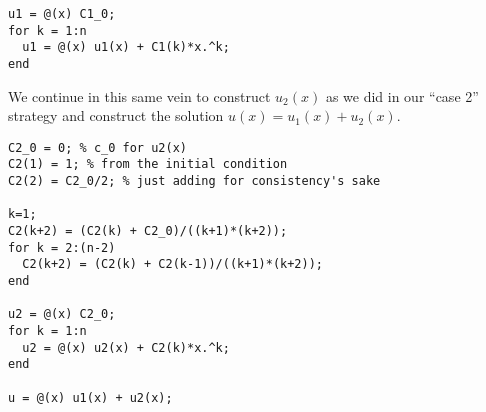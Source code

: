 \begin{lstlisting}[name=lec9_ex1]
u1 = @(x) C1_0;
for k = 1:n
  u1 = @(x) u1(x) + C1(k)*x.^k;
end
\end{lstlisting}
We continue in this same vein to construct $u_2(x)$ as we did in our ``case 2'' strategy and construct the solution $u(x) = u_1(x) + u_2(x)$.
\begin{lstlisting}[name=lec9_ex1]
C2_0 = 0; % c_0 for u2(x)
C2(1) = 1; % from the initial condition
C2(2) = C2_0/2; % just adding for consistency's sake

k=1;
C2(k+2) = (C2(k) + C2_0)/((k+1)*(k+2));
for k = 2:(n-2)
  C2(k+2) = (C2(k) + C2(k-1))/((k+1)*(k+2));
end

u2 = @(x) C2_0;
for k = 1:n
  u2 = @(x) u2(x) + C2(k)*x.^k;
end

u = @(x) u1(x) + u2(x);
\end{lstlisting}

